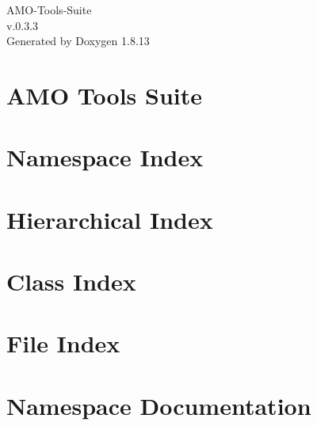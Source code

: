 \documentclass[twoside]{book}
\newcommand{\+}{\discretionary{\mbox{\scriptsize$\hookleftarrow$}}{}{}}
\newcommand{\clearemptydoublepage}{%
  \newpage{\pagestyle{empty}\cleardoublepage}%
}
\begin{document}
\hypersetup{pageanchor=false,
             bookmarksnumbered=true,
             pdfencoding=unicode
            }
\begin{titlepage}
\vspace*{7cm}
\begin{center}%
{\Large A\+M\+O-\/\+Tools-\/\+Suite \\[1ex]\large v.\+0.\+3.\+3 }\\
\vspace*{1cm}
{\large Generated by Doxygen 1.8.13}\\
\end{center}
\end{titlepage}
\clearemptydoublepage
{}
\tableofcontents
\clearemptydoublepage
{}
\hypersetup{pageanchor=true}

\chapter{A\+MO Tools Suite}
\label{index}\hypertarget{index}{}
\chapter{Namespace Index}

\chapter{Hierarchical Index}

\chapter{Class Index}

\chapter{File Index}

\chapter{Namespace Documentation}

\end{document}
